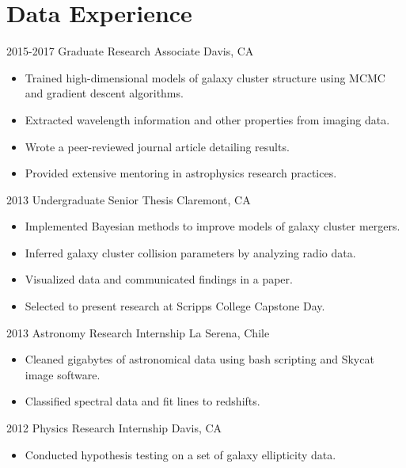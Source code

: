 \documentclass[]{cv-style}          %
\begin{document}


\section{Data Experience}

\begin{entrylist}

\entry
  {2015-2017}
  {Graduate Research Associate}
  {Davis, CA}
  { 
  \begin{itemize}
    \item Trained high-dimensional models of galaxy cluster structure using MCMC and gradient descent algorithms. 
    \item Extracted wavelength information and other properties from imaging data.
    \item Wrote a peer-reviewed journal article detailing results.
    \item Provided extensive mentoring in astrophysics research practices.\\
  \end{itemize}}
\entry
  {2013}
  {Undergraduate Senior Thesis}
  {Claremont, CA}
  { 
  \begin{itemize}
    \item Implemented Bayesian methods to improve models of galaxy cluster mergers.
    \item Inferred galaxy cluster collision parameters by analyzing radio data.
    \item Visualized data and communicated findings in a paper.
    \item Selected to present research at Scripps College Capstone Day.\\
  \end{itemize}}
\entry
  {2013}
  {Astronomy Research Internship}
  {La Serena, Chile}
  {
  \begin{itemize}
    \item Cleaned gigabytes of astronomical data using bash scripting and Skycat image software.
    \item Classified spectral data and fit lines to redshifts.\\
  \end{itemize}}
\entry
  {2012}
  {Physics Research Internship}
  {Davis, CA}
  {
  \begin{itemize}
    \item Conducted hypothesis testing on a set of galaxy ellipticity data.\\
  \end{itemize}}


\end{entrylist}
\end{document}
